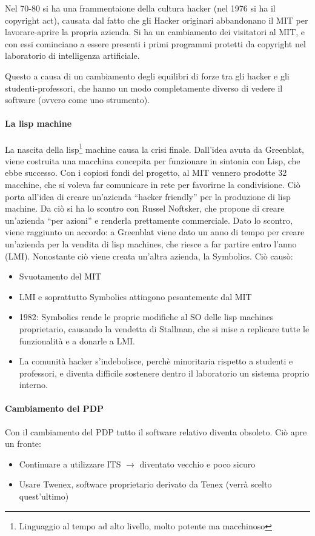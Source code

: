 Nel 70-80 si ha una frammentaione della cultura hacker (nel 1976 si ha il copyright act), causata dal fatto che gli Hacker originari abbandonano il MIT per lavorare-aprire la propria azienda. Si ha un cambiamento dei visitatori al MIT, e con essi cominciano a essere presenti i primi programmi protetti da copyright nel laboratorio di intelligenza artificiale.

Questo a causa di un cambiamento degli equilibri di forze tra gli hacker e gli studenti-professori, che hanno un modo completamente diverso di vedere il software (ovvero come uno strumento).

\paragraph*{La lisp machine} La nascita della lisp\footnote{Linguaggio al tempo ad alto livello, molto potente ma macchinoso} machine causa la crisi finale. Dall'idea avuta da Greenblat, viene costruita una macchina concepita per funzionare in sintonia con Lisp, che ebbe successo. Con i copiosi fondi del progetto, al MIT vennero prodotte 32 macchine, che si voleva far comunicare in rete per favorirne la condivisione. Ci\`o porta all'idea di creare un'azienda ``hacker friendly'' per la produzione di lisp machine. Da ci\`o si ha lo scontro con Russel Noftsker, che propone di creare un'azienda ``per azioni'' e renderla prettamente commerciale. Dato lo scontro, viene raggiunto un accordo: a Greenblat viene dato un anno di tempo per creare un'azienda per la vendita di lisp machines, che riesce a far partire entro l'anno (LMI). Nonostante ci\`o viene creata un'altra azienda, la Symbolics. Ci\`o caus\`o:
\begin{itemize}

\item Svuotamento del MIT
\item LMI e soprattutto Symbolics attingono pesantemente dal MIT
\item 1982: Symbolics rende le proprie modifiche al SO delle lisp machines proprietario, causando la vendetta di Stallman, che si mise a replicare tutte le funzionalit\`a e a donarle a LMI.
\item La comunit\`a hacker s'indebolisce, perch\`e minoritaria rispetto a studenti e professori, e diventa difficile sostenere dentro il laboratorio un sistema proprio interno.

\end{itemize}

\paragraph*{Cambiamento del PDP} Con il cambiamento del PDP tutto il software relativo diventa obsoleto. Ci\`o apre un fronte:
\begin{itemize}

\item Continuare a utilizzare ITS $\to$ diventato vecchio e poco sicuro
\item Usare Twenex, software proprietario derivato da Tenex (verr\`a scelto quest'ultimo)

\end{itemize}

